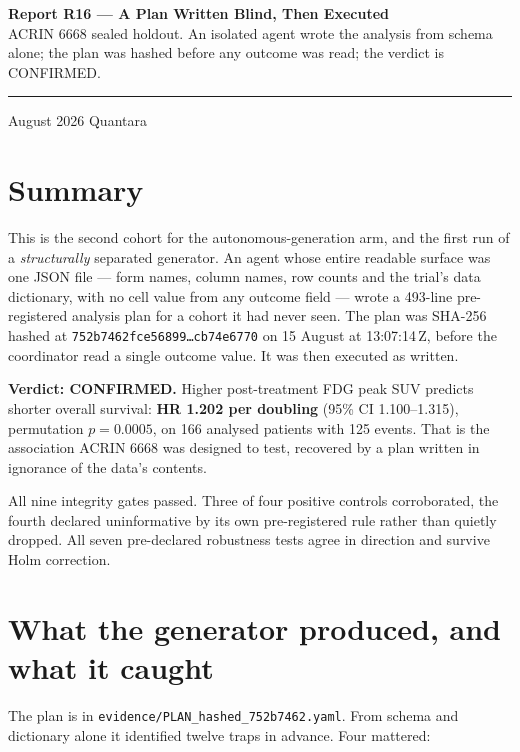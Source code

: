 \documentclass[11pt,a4paper]{article}
\begin{document}
\thispagestyle{empty}
\noindent
{\large\bfseries\color{qnavy} Report R16 --- A Plan Written Blind, Then Executed}\\[2pt]
{\color{qgrey}ACRIN 6668 sealed holdout. An isolated agent wrote the analysis from schema alone;
the plan was hashed before any outcome was read; the verdict is CONFIRMED.}\\[6pt]
{\color{qgrey}\rule{\textwidth}{0.4pt}}

\medskip
{} August 2026 \quad\textbullet\quad Quantara

\section*{Summary}

This is the second cohort for the autonomous-generation arm, and the first run of a
\emph{structurally} separated generator. An agent whose entire readable surface was one
JSON file --- form names, column names, row counts and the trial's data dictionary, with no cell
value from any outcome field --- wrote a 493-line pre-registered analysis plan for a cohort it had
never seen. The plan was SHA-256 hashed at
\texttt{752b7462fce56899\ldots cb74e6770} on 15 August at 13:07:14\,Z, before the coordinator
read a single outcome value. It was then executed as written.

\textbf{Verdict: CONFIRMED.} Higher post-treatment FDG peak SUV predicts shorter overall survival:
\textbf{HR 1.202 per doubling} (95\% CI 1.100--1.315), permutation $p = 0.0005$, on 166 analysed
patients with 125 events. That is the association ACRIN 6668 was designed to test, recovered by a
plan written in ignorance of the data's contents.

All nine integrity gates passed. Three of four positive controls corroborated, the fourth
declared uninformative by its own pre-registered rule rather than quietly dropped. All seven
pre-declared robustness tests agree in direction and survive Holm correction.

\section{What the generator produced, and what it caught}

The plan is in \texttt{evidence/PLAN\_hashed\_752b7462.yaml}. From schema and dictionary alone it
identified twelve traps in advance. Four mattered:
\end{document}
